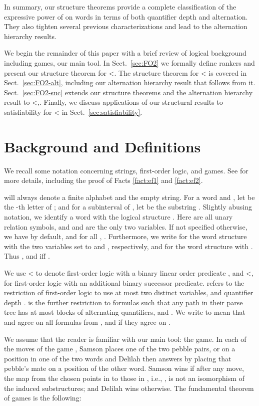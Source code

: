 \documentclass{LMCS}
\begin{document}
In summary, our structure theorems provide a complete classification of
the expressive power of  on words in terms of both quantifier
depth and alternation.  They also tighten several previous
characterizations and lead to the alternation hierarchy results.

We begin the remainder of this paper with a brief review
of logical background including \ef{} games, our main tool. In 
Sect.~\ref{sec:FO2} we formally define rankers and present our structure
theorem for <. The structure theorem for
< is covered in Sect.~\ref{sec:FO2-alt},
including our alternation hierarchy result that follows from
it. Sect.~\ref{sec:FO2-suc} extends our structure theorems and the
alternation hierarchy result to <,\suc. Finally, we discuss
applications of our structural results to satisfiability for < in
Sect.~\ref{sec:satisfiability}.

\section{Background and Definitions} \label{sec:background}



We recall some notation concerning strings, first-order logic,
and \ef{} games.  See \cite{I99} for more details, including the
proof of Facts \ref{fact:ef1} and \ref{fact:ef2}.

 will always denote a finite alphabet and  the empty
string. For a word  and , let  be
the -th letter of ; and for  a subinterval of , let
 be the substring . Slightly abusing notation, we
identify a word  with the logical structure .
Here  are all unary relation symbols,
and  and  are the only two variables. If not specified otherwise, we
have  by default, and for all ,
.
Furthermore, we write  for the word structure  with the two
variables set to  and , respectively, and  for the word
structure  with . Thus , and  iff .

We use < to denote first-order logic with a binary linear order
predicate , and <, \suc for first-order logic with an
additional binary successor predicate.  refers to the restriction
of first-order logic to use at most two distinct variables, and quantifier
depth .  is the further restriction to formulas such that
any path in their parse tree has at most  blocks of alternating
quantifiers, and . We write
 to mean that  and  agree on all formulas from
, and  if they agree on
.

We assume that the reader is familiar with our main tool: the \ef{} game. In
each of the  moves of the game , Samson places one of the
two pebble pairs,  or  on a position in one of the two words and
Delilah then answers by placing that pebble's mate on a position of the
other word. Samson wins if after any move, the map from the chosen points in
 to those in , i.e., ,  is not an
isomorphism of the induced substructures; and Delilah wins otherwise. The
fundamental theorem of \ef{} games is the following:
\end{document}
